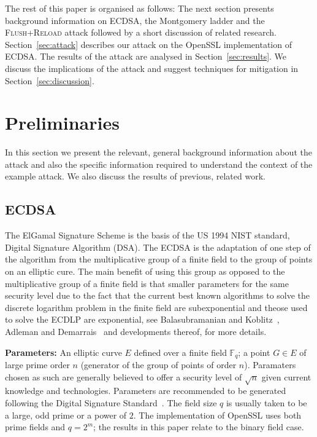 \documentclass[twocolumn]{svjour3}
\newcommand{\F}{{\mathbb F}}
\begin{document}
The rest of this paper is organised as follows: The next section presents background information on ECDSA, the Montgomery ladder and the \textsc{Flush+Reload} attack followed by a short discussion of related research. %
Section~\ref{sec:attack} describes our attack on the OpenSSL implementation of ECDSA.
The results of the attack are analysed in Section~\ref{sec:results}.
We discuss the implications of the attack and suggest techniques for mitigation in Section~\ref{sec:discussion}.

\section{Preliminaries}\label{sec:background}
In this section we present the relevant, general background information about the attack and also the specific information required to understand the context of the example attack. We also discuss the results of previous, related work.

\subsection{ECDSA}\label{sub:ecdsa}

The ElGamal Signature Scheme \cite{Elgamal85} is the basis of the US 1994 NIST standard, Digital Signature Algorithm (DSA). The ECDSA is the adaptation of one step of the algorithm from the multiplicative group of a finite field to the group of points on an elliptic cure. The main benefit of using this group as opposed to the multiplicative group of a finite field is that smaller parameters for the same security level \cite{koblitz87elliptic,miller85use} due to the fact that the current best known algorithms to solve the discrete logarithm problem in the finite field are subexponential and theose used to solve the ECDLP are exponential, see Balasubramanian and Koblitz~\cite{balasubramanian-koblitz}, Adleman and Demarrais~\cite{adelman-demarrais} and developments thereof, for more details. 


{\bf{Parameters:}} An elliptic curve $E$ defined over a finite field $\F_{q}$; a point $G\in E$ of large prime order $n$ (generator of the group of points of order $n$). Paramaters chosen as such are generally believed to offer a security level of $\sqrt{n}$ given current knowledge and technologies. Parameters are recommended to be generated following the Digital Signature Standard~\cite{fips}. The field size $q$ is usually taken to be a large, odd prime or a power of $2$. The implementation of OpenSSL uses both prime fields and $q=2^m$; the results in this paper relate to the binary field case.
\end{document}
